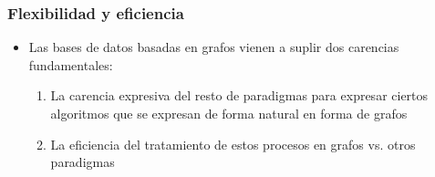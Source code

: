 \documentclass[14pt]{beamer}
\begin{document}
\begin{frame}
  \frametitle{Flexibilidad y eficiencia}
\begin{itemize}
\item Las bases de datos basadas en grafos vienen a suplir dos carencias
  fundamentales:
  \begin{enumerate}
  \item La carencia expresiva del resto de paradigmas para expresar ciertos
    algoritmos que se expresan de forma natural en forma de grafos
  \item La eficiencia del tratamiento de estos procesos en grafos vs. otros
    paradigmas
  \end{enumerate}




\end{itemize}
\end{frame}
\end{document}
